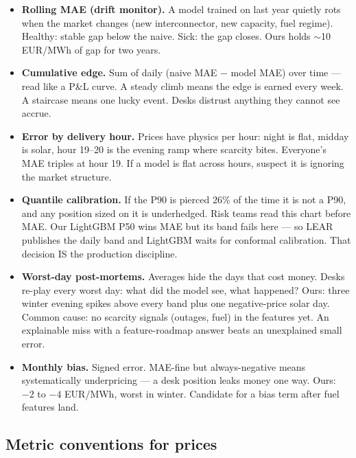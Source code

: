\begin{itemize}
  \item \textbf{Rolling MAE (drift monitor).} A model trained on last
        year quietly rots when the market changes (new interconnector,
        new capacity, fuel regime). Healthy: stable gap below the naive.
        Sick: the gap closes. Ours holds $\sim$10 EUR/MWh of gap for two
        years.
  \item \textbf{Cumulative edge.} Sum of daily (naive MAE $-$ model MAE)
        over time --- read like a P\&L curve. A steady climb means the
        edge is earned every week. A staircase means one lucky event.
        Desks distrust anything they cannot see accrue.
  \item \textbf{Error by delivery hour.} Prices have physics per hour:
        night is flat, midday is solar, hour 19--20 is the evening ramp
        where scarcity bites. Everyone's MAE triples at hour 19. If a
        model is flat across hours, suspect it is ignoring the market
        structure.
  \item \textbf{Quantile calibration.} If the P90 is pierced 26\% of the
        time it is not a P90, and any position sized on it is underhedged.
        Risk teams read this chart before MAE. Our LightGBM P50 wins MAE
        but its band fails here --- so LEAR publishes the daily band and
        LightGBM waits for conformal calibration. That decision IS the
        production discipline.
  \item \textbf{Worst-day post-mortems.} Averages hide the days that cost
        money. Desks re-play every worst day: what did the model see, what
        happened? Ours: three winter evening spikes above every band plus
        one negative-price solar day. Common cause: no scarcity signals
        (outages, fuel) in the features yet. An explainable miss with a
        feature-roadmap answer beats an unexplained small error.
  \item \textbf{Monthly bias.} Signed error. MAE-fine but always-negative
        means systematically underpricing --- a desk position leaks money
        one way. Ours: $-2$ to $-4$ EUR/MWh, worst in winter. Candidate
        for a bias term after fuel features land.
\end{itemize}

\subsection{Metric conventions for prices}

